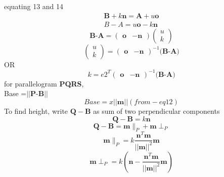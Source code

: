 \documentclass[journal,10pt,twocolumn]{article}
\begin{document}
equating 13 and 14
\begin{eqnarray}
	\boldsymbol{B}+k\boldsymbol{n}=\boldsymbol{A}+u\boldsymbol{o}\\
    B-A=u\boldsymbol{o}-k\boldsymbol{n}
    \end{eqnarray}
\begin{equation}
	\textbf{B-A}=
\begin{pmatrix}
    \boldsymbol{o} & -\boldsymbol{n}
\end{pmatrix}
\begin{pmatrix}
    u\\
    k
\end{pmatrix}
\end{equation}
\begin{equation}
\begin{pmatrix}
    u\\
    k
\end{pmatrix}
=
\begin{pmatrix}
    \boldsymbol{o} & -\boldsymbol{n}
\end{pmatrix}^{-1}
	\textbf{(B-A)}
\end{equation}
OR
\begin{equation}
k={e2}^T
\begin{pmatrix}
    \boldsymbol{o} & -\boldsymbol{n}
\end{pmatrix}^{-1}
	\textbf{(B-A)}
\end{equation}
for parallelogram \textbf{PQRS}, \\
Base =$||\boldsymbol{P}$-$\boldsymbol{B}||$
\begin{equation}
Base=x||\boldsymbol{m}||(from-eq12)
\end{equation}
To find height, write $\boldsymbol{Q}-\boldsymbol{B}$ as sum of two perpendicular components
\begin{equation}
    \boldsymbol{Q}-\boldsymbol{B}=k\boldsymbol{n}
\end{equation}
\begin{equation}
    \boldsymbol{Q}-\boldsymbol{B}=\boldsymbol{m} \parallel_P +\boldsymbol{m} \perp_P
\end{equation}
\begin{equation}
    \boldsymbol{m} \parallel_P=k{\frac{\boldsymbol{n}^T\boldsymbol{m}}{||\boldsymbol{m}||^2}}\boldsymbol{m}
\end{equation}
\begin{equation}
\boldsymbol{m} \perp_P=k(\boldsymbol{n}-{\frac{\boldsymbol{n}^T\boldsymbol{m}}{||\boldsymbol{m}||^2}}\boldsymbol{m})
\end{equation}
\end{document}

